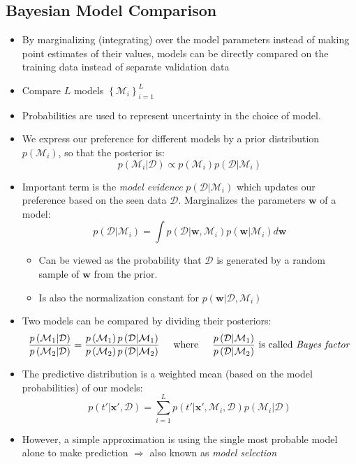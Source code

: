 \subsection{Bayesian Model Comparison}
\begin{itemize}
	\item By marginalizing (integrating) over the model parameters instead of making point estimates of their values, models can be directly compared on the training data instead of separate validation data
	\item Compare $L$ models $\left\{\mathcal{M}_i\right\}_{i=1}^{L}$
	\item Probabilities are used to represent uncertainty in the choice of model. 
	\item We express our preference for different models by a prior distribution $p\left(\mathcal{M}_i\right)$, so that the posterior is:
	$$p\left(\mathcal{M}_i|\mathcal{D}\right)\propto p\left(\mathcal{M}_i\right)p\left(\mathcal{D}|\mathcal{M}_i\right)$$
	\item Important term is the \textit{model evidence} $p\left(\mathcal{D}|\mathcal{M}_i\right)$ which updates our preference based on the seen data $\mathcal{D}$. Marginalizes the parameters $\bm{w}$ of a model:
	$$p\left(\mathcal{D}|\mathcal{M}_i\right) = \int p\left(\mathcal{D}|\bm{w}, \mathcal{M}_i\right)p\left(\bm{w}|\mathcal{M}_i\right)d\bm{w}$$
	\begin{itemize}
		\item Can be viewed as the probability that $\mathcal{D}$ is generated by a random sample of $\bm{w}$ from the prior. 
		\item Is also the normalization constant for $p\left(\bm{w}|\mathcal{D}, \mathcal{M}_i\right)$
	\end{itemize}
	\item Two models can be compared by dividing their posteriors:
	$$\frac{p\left(\mathcal{M}_1|\mathcal{D}\right)}{p\left(\mathcal{M}_2|\mathcal{D}\right)} = \frac{p\left(\mathcal{M}_1\right)p\left(\mathcal{D}|\mathcal{M}_1\right)}{p\left(\mathcal{M}_2\right)p\left(\mathcal{D}|\mathcal{M}_2\right)} \text{\hspace{5mm}where\hspace{5mm}} \frac{p\left(\mathcal{D}|\mathcal{M}_1\right)}{p\left(\mathcal{D}|\mathcal{M}_2\right)}\text{ is called \textit{Bayes factor}}$$
	\item The predictive distribution is a weighted mean (based on the model probabilities) of our models:
	$$p\left(t'|\bm{x}',\mathcal{D}\right) = \sum\limits_{i=1}^{L}p\left(t'|\bm{x}', \mathcal{M}_i, \mathcal{D}\right) p\left(\mathcal{M}_i | \mathcal{D}\right)$$
	\item However, a simple approximation is using the single most probable model alone to make prediction $\Rightarrow$ also known as \textit{model selection}
\end{itemize}
